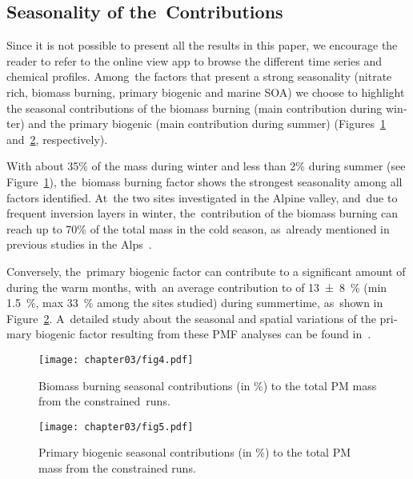 \begin{otherlanguage}{english}
\subsection{Seasonality of the~Contributions}%
\label{sub:seasonality_of_the_contributions}

Since it is not possible to present all the results in this paper, we encourage the reader
to refer to the online view app to browse the different time series and chemical profiles.
Among~the factors that present a strong seasonality (nitrate rich, biomass burning,
primary biogenic and marine SOA) we choose to highlight the seasonal contributions of the
biomass burning (main contribution during winter) and the primary biogenic (main
contribution during summer) (Figures~\ref{fig:fig4} and~\ref{fig:fig5}, respectively).

With about {35}{\%} of the \PM{} mass during winter and less than {2}{\%} during summer
(see Figure~\ref{fig:fig4}), the~biomass burning factor shows the strongest seasonality
among all factors identified. At~the two sites investigated in the Alpine valley, and~due
to frequent inversion layers in winter, the~contribution of the biomass burning can reach
up to {70}{\%} of the total \PM{} mass in the cold season, as~already mentioned in
previous studies in the
Alps~\autocite{favezIntercomparison2010,bonvalotEstimating2016,srivastavaSpeciation2018,herichOverview2014}.

Conversely, the~primary biogenic factor can contribute to a significant amount of \PM{}
during the warm months, with~an average contribution to \PM{} of \SI{13\pm8}{\percent}
(min \SI{1.5}{\percent}, max \SI{33}{\percent} among the sites studied) during summertime,
as~shown in Figure~\ref{fig:fig5}. A~detailed study about the seasonal and spatial
variations of the primary biogenic factor resulting from these PMF analyses can be found
in~\mbox{\textcite{samakePolyols2019}}.

\begin{figure}[ht]
    \centering
    \texttt{[image: chapter03/fig4.pdf]}
    \caption{Biomass burning seasonal contributions (in \si{\percent}) to the total PM mass
    from the constrained~runs.}
    \label{fig:fig4}
\end{figure}

\begin{figure}[ht]
    \centering
    \texttt{[image: chapter03/fig5.pdf]}
    \caption{Primary biogenic seasonal contributions (in \si{\percent}) to the total PM mass
    from the constrained runs.}
    \label{fig:fig5}
\end{figure}



\end{otherlanguage}
